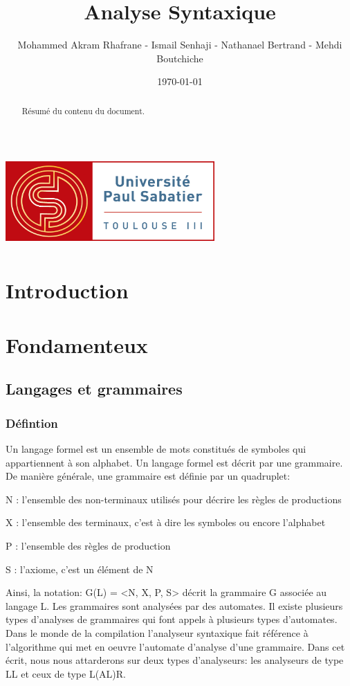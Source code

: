 \documentclass{article}
\title{Analyse Syntaxique}
\author{Mohammed Akram Rhafrane - Ismail Senhaji - Nathanael Bertrand - Mehdi Boutchiche\\}
\date{\today}
\begin{document}
\begin{center}
\includegraphics[width=8cm,height=35mm]{logo-ups.jpg} 
\maketitle
\end{center}

\newpage
\tableofcontents

\newpage
\begin{abstract}
Résumé du contenu du document.
\end{abstract}

\newpage
\section{Introduction}
\label{hints}

\newpage
\section{Fondamenteux}
\label{hints}
\subsection{Langages et grammaires}
\subsubsection{Défintion}
Un langage formel est un ensemble de mots constitués de symboles qui appartiennent à son alphabet.
Un langage formel est décrit par une grammaire.
De manière générale, une grammaire est définie par un quadruplet:

    N : l’ensemble des non-terminaux utilisés pour décrire les règles de productions

    X : l’ensemble des terminaux, c’est à dire les symboles ou encore l’alphabet

    P : l’ensemble des règles de production

    S : l’axiome, c’est un élément de N

Ainsi, la notation: G(L) = <N, X, P, S> décrit la grammaire G associée au langage L.
Les grammaires sont analysées par des automates. Il existe plusieurs types d’analyses de grammaires qui font appels à plusieurs types d’automates.
Dans le monde de la compilation l’analyseur syntaxique fait référence à l’algorithme qui met en oeuvre l’automate d’analyse d’une grammaire.
Dans cet écrit, nous nous attarderons sur deux types d’analyseurs: les analyseurs de type LL et ceux de type L(AL)R.
\end{document}
